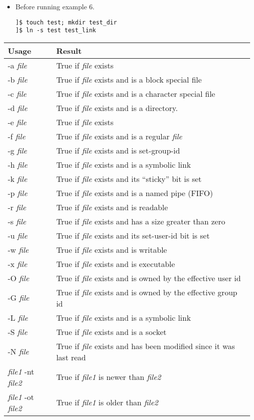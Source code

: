 \documentclass[17pt,dvips]{foils}
\begin{document}
\begin{itemize}
\item Before running example 6.
\begin{verbatim}
]$ touch test; mkdir test_dir
]$ ln -s test test_link
\end{verbatim}
\end{itemize}
{\tiny
\begin{tabular}{|l|l|} \hline \hline
Usage & Result \\ \hline \hline
-a {\em file} & True if {\em file} exists\\ \hline
-b {\em file} & True if {\em file} exists and is a block special file\\ \hline
-c {\em file} & True if {\em file} exists and is a character special file\\ \hline
-d {\em file} & True if {\em file} exists and is a directory. \\ \hline
-e {\em file} & True if {\em file} exists\\ \hline
-f {\em file} & True if {\em file} exists and is a regular {\em file}\\ \hline
-g {\em file} & True if {\em file} exists and is set-group-id\\ \hline
-h {\em file} & True if {\em file} exists and is a symbolic link\\ \hline
-k {\em file} & True if {\em file} exists and its ``sticky'' bit is set\\ \hline
-p {\em file} & True if {\em file} exists and is a named pipe (FIFO)\\ \hline
-r {\em file} & True if {\em file} exists and is readable\\ \hline
-s {\em file} & True if {\em file} exists and has a size greater than zero\\ \hline
-u {\em file} & True if {\em file} exists and its set-user-id bit is set\\ \hline
-w {\em file} & True if {\em file} exists and is writable\\ \hline
-x {\em file} & True if {\em file} exists and is executable\\ \hline
-O {\em file} & True if {\em file} exists and is owned by the effective user id\\ \hline
-G {\em file} & True if {\em file} exists and is owned by  the  effective group id\\ \hline
-L {\em file} & True if {\em file} exists and is a symbolic link\\ \hline
-S {\em file} & True if {\em file} exists and is a socket\\ \hline
-N {\em file} & True  if {\em file} exists and has been modified since it was last read\\ \hline
{\em file1} -nt {\em file2}  & True if {\em file1} is newer than {\em file2}\\ \hline
{\em file1} -ot {\em file2}  & True if {\em file1} is older than {\em file2}\\ \hline \hline
\end{tabular}
}
\end{document}
